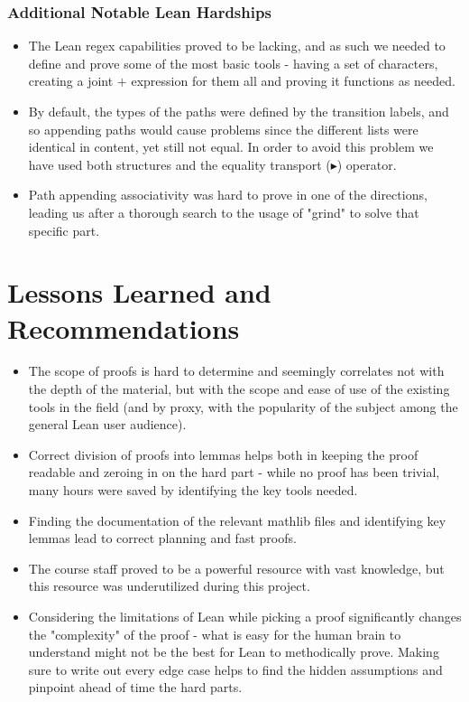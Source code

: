 \documentclass[]{article}
\begin{document}
\subsubsection{Additional Notable Lean Hardships}
\begin{itemize}
	\item 
	The Lean regex capabilities proved to be lacking, and as such we needed to define and prove some of the most basic tools - having a set of characters, creating a joint $+$ expression for them all and proving it functions as needed.
	\item 
	By default, the types of the paths were defined by the transition labels, and so appending paths would cause problems since the different lists were identical in content, yet still not equal. In order to avoid this problem we have used both structures and the equality transport ($\blacktriangleright$) operator.
	\item 
	Path appending associativity was hard to prove in one of the directions, leading us after a thorough search to the usage of "grind" to solve that specific part.
\end{itemize}
\section{Lessons Learned and Recommendations}
\begin{itemize}
	\item 
	The scope of proofs is hard to determine and seemingly correlates not with the depth of the material, but with the scope and ease of use of the existing tools in the field (and by proxy, with the popularity of the subject among the general Lean user audience).
	\item 
	Correct division of proofs into lemmas helps both in keeping the proof readable and zeroing in on the hard part - while no proof has been trivial, many hours were saved by identifying the key tools needed.
	\item 
	Finding the documentation of the relevant mathlib files and identifying key lemmas lead to correct planning and fast proofs.
	\item 
	The course staff proved to be a powerful resource with vast knowledge, but this resource was underutilized during this project.
	\item 
	Considering the limitations of Lean while picking a proof significantly changes the "complexity" of the proof - what is easy for the human brain to understand might not be the best for Lean to methodically prove. Making sure to write out every edge case helps to find the hidden assumptions and pinpoint ahead of time the hard parts.
\end{itemize}
\end{document}
